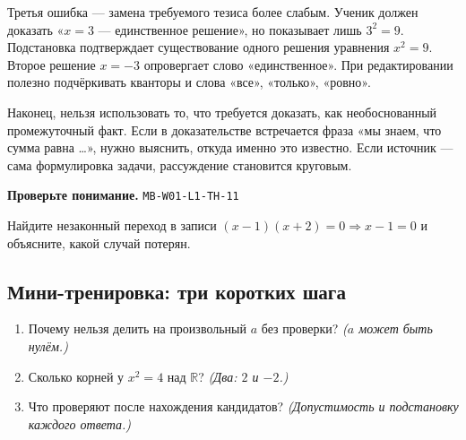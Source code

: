 \documentclass[11pt,a4paper,openany]{book}
\newcommand{\muid}[1]{\texttt{\footnotesize #1}}
\begin{document}
Третья ошибка — замена требуемого тезиса более слабым. Ученик должен доказать «$x=3$ — единственное решение», но показывает лишь $3^2=9$. Подстановка подтверждает существование одного решения уравнения $x^2=9$. Второе решение $x=-3$ опровергает слово «единственное». При редактировании полезно подчёркивать кванторы и слова «все», «только», «ровно».


Наконец, нельзя использовать то, что требуется доказать, как необоснованный промежуточный факт. Если в доказательстве встречается фраза «мы знаем, что сумма равна …», нужно выяснить, откуда именно это известно. Если источник — сама формулировка задачи, рассуждение становится круговым.


\begin{center}
\end{center}

\begin{learnbox}\textbf{Проверьте понимание.} \muid{MB-W01-L1-TH-11}\par Найдите незаконный переход в записи $(x-1)(x+2)=0\Rightarrow x-1=0$ и объясните, какой случай потерян.\end{learnbox}

\subsection*{Мини-тренировка: три коротких шага}
\begin{enumerate}[label=\arabic*),leftmargin=*,itemsep=3pt]

\item Почему нельзя делить на произвольный $a$ без проверки? \textit{($a$ может быть нулём.)}

\item Сколько корней у $x^2=4$ над $\mathbb R$? \textit{(Два: $2$ и $-2$.)}

\item Что проверяют после нахождения кандидатов? \textit{(Допустимость и подстановку каждого ответа.)}

\end{enumerate}
\end{document}
